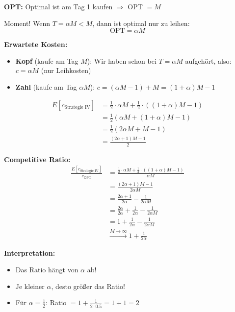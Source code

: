 \documentclass[12pt,a4paper]{article}
\theoremstyle{definition}
\begin{document}
\begin{tcolorbox}[colback=cyan!5!white,colframe=cyan!75!black,title=Fall $T = \alpha M$]

\textbf{OPT:} Optimal ist am Tag 1 kaufen $\Rightarrow$ OPT $= M$

Moment! Wenn $T = \alpha M < M$, dann ist optimal nur zu leihen:
\[
\text{OPT} = \alpha M
\]

\textbf{Erwartete Kosten:}
\begin{itemize}
    \item \textbf{Kopf} (kaufe am Tag $M$): Wir haben schon bei $T = \alpha M$ aufgehört, also: $c = \alpha M$ (nur Leihkosten)
    \item \textbf{Zahl} (kaufe am Tag $\alpha M$): $c = (\alpha M - 1) + M = (1+\alpha)M - 1$
\end{itemize}

\begin{align*}
E[c_{\text{Strategie IV}}] &= \frac{1}{2} \cdot \alpha M + \frac{1}{2} \cdot ((1+\alpha)M - 1) \\
&= \frac{1}{2}(\alpha M + (1+\alpha)M - 1) \\
&= \frac{1}{2}(2\alpha M + M - 1) \\
&= \frac{(2\alpha + 1)M - 1}{2}
\end{align*}

\textbf{Competitive Ratio:}
\begin{align*}
\frac{E[c_{\text{Strategie IV}}]}{c_{\text{OPT}}} &= \frac{\frac{1}{2} \cdot \alpha M + \frac{1}{2} \cdot ((1+\alpha)M - 1)}{\alpha M} \\
&= \frac{(2\alpha + 1)M - 1}{2\alpha M} \\
&= \frac{2\alpha + 1}{2\alpha} - \frac{1}{2\alpha M} \\
&= \frac{2\alpha}{2\alpha} + \frac{1}{2\alpha} - \frac{1}{2\alpha M} \\
&= 1 + \frac{1}{2\alpha} - \frac{1}{2\alpha M} \\
&\xrightarrow{M \to \infty} 1 + \frac{1}{2\alpha}
\end{align*}

\textbf{Interpretation:}
\begin{itemize}
    \item Das Ratio hängt von $\alpha$ ab!
    \item Je kleiner $\alpha$, desto größer das Ratio!
    \item Für $\alpha = \frac{1}{2}$: Ratio $= 1 + \frac{1}{2 \cdot 0.5} = 1 + 1 = 2$
\end{itemize}
\end{tcolorbox}
\end{document}
